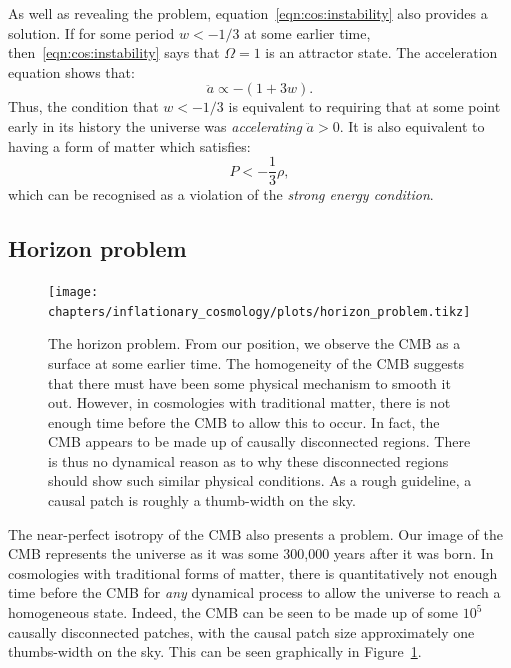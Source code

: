 As well as revealing the problem, equation~\eqref{eqn:cos:instability} also provides a solution. If for some period $w<-1/3$ at some earlier time, then~\eqref{eqn:cos:instability} says that $\Omega=1$ is an attractor state. The acceleration equation shows that:
\begin{equation}
  \ddot{a} \propto -(1+3w).
  \label{eqn:cos:Raychaudhuri_acc}
\end{equation}
Thus, the condition that $w<-1/3$ is equivalent to requiring that at some point early in its history the universe was {\em accelerating\/} $\ddot{a}>0$. It is also equivalent to having a form of matter which satisfies:
\begin{equation}
  P < -\frac{1}{3}\rho,
  \label{eqn:cos:SEC_violation}
\end{equation}
which can be recognised as a violation of the {\em strong energy condition}.

\subsection{Horizon problem}
\begin{figure}[tp]
  \centering
  \texttt{[image: chapters/inflationary\_cosmology/plots/horizon\_problem.tikz]}
  \caption{The horizon problem. From our position, we observe the CMB as a surface at some earlier time. The homogeneity of the CMB suggests that there must have been some physical mechanism to smooth it out. However, in cosmologies with traditional matter, there is not enough time before the CMB to allow this to occur. In fact, the CMB appears to be made up of causally disconnected regions. There is thus no dynamical reason as to why these disconnected regions should show such similar physical conditions. As a rough guideline, a causal patch is roughly a thumb-width on the sky.}\label{fig:cos:horizon_problem}
\end{figure}
The near-perfect isotropy of the CMB also presents a problem. Our image of the CMB represents the universe as it was some 300,000 years after it was born. In cosmologies with traditional forms of matter, there is quantitatively not enough time before the CMB for {\em any\/} dynamical process to allow the universe to reach a homogeneous state. Indeed, the CMB can be seen to be made up of some $10^{5}$ causally disconnected patches, with the causal patch size approximately one thumbs-width on the sky. This can be seen graphically in Figure~\ref{fig:cos:horizon_problem}.

